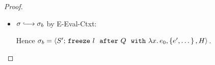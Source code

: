 \begin{proof}
\begin{itemize}
\begin{itemize}
\begin{itemize}
\begin{enumerate}
            The proof is as follows:

            From the premises of {\sc E-Spawn-Handler}, \\
            $S(l) = \state{d_1}{\status_1}$ and
            $d_2 \userleq d_1$ and 
            $d_2 \notin H$ and
            $d_2 \in Q$.

            Therefore, by {\sc E-Spawn-Handler}, \\
            $\config{S}{\freezeafterfull{l}{Q}{\lam{x}{e_0}}{\setof{\subst{e_0}{x}{d'_2},
                  e, \dots}} {\{d'_2\}\cup H}} \parstepsto \\
            \config{S}{\freezeafterfull{l}{Q}{\lam{x}{e_0}}{\setof{\subst{e_0}{x}{d_2}, \subst{e_0}{x}{d'_2},
                  e, \dots}} \setof{d_2} \cup {\{d'_2\}\cup H}}$, \\
            which is equivalent to \\

            $\config{S}{\freezeafterfull{l}{Q}{\lam{x}{e_0}}{\setof{\subst{e_0}{x}{d_2},
                  \subst{e_0}{x}{d'_2}, e, \dots}} {\{d_2, d'_2\}\cup H}}$.

            Hence $\conf_b \parstepsto \conf_c$.
          \end{enumerate}

        \item $d'_2 = d_2$:

          Choose:
          $\conf_c = \config{S}{\freezeafterfull{l}{Q}{\lam{x}{e_0}}{\setof{\subst{e_0}{x}{d_2},
                e, \dots}} {\{d_2\}\cup H}}$, \\
          $i = 0$ and $j = 0$.

          Then
          $\config{S}{\freezeafterfull{l}{Q}{\lam{x}{e_0}}{\setof{\subst{e_0}{x}{d_2},
                e, \dots}} {\{d_2\}\cup H}} = \conf_c$ and $\conf_b =
          \conf_c$, as required.
        \end{itemize}

      \item $\conf \parstepsto \conf_b$ by {\sc E-Eval-Ctxt}:

        Hence $\sigma_b =
        \langle S';\, \mbox{\texttt{freeze}}~l~~{\mbox{\texttt{after}}}~Q~~{\mbox{\texttt{with}}}~\lambda x.\,e_0, \left\{e',
              \dots\right\}, H \rangle$.



\end{itemize}
\end{itemize}
\end{proof}

